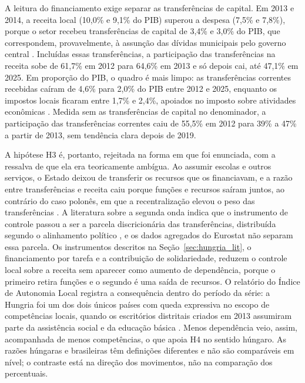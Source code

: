 A leitura do financiamento exige separar as transferências de capital. Em 2013 e 2014, a receita local (10,0\% e 9,1\% do PIB) superou a despesa (7,5\% e 7,8\%), porque o setor recebeu transferências de capital de 3,4\% e 3,0\% do PIB, que correspondem, provavelmente, à assunção das dívidas municipais pelo governo central \citep{Bethlendi2018, Racz202191}. Incluídas essas transferências, a participação das transferências na receita sobe de 61,7\% em 2012 para 64,6\% em 2013 e só depois cai, até 47,1\% em 2025. Em proporção do PIB, o quadro é mais limpo: as transferências correntes recebidas caíram de 4,6\% para 2,0\% do PIB entre 2012 e 2025, enquanto os impostos locais ficaram entre 1,7\% e 2,4\%, apoiados no imposto sobre atividades econômicas \citep{Kecso2020}. Medida sem as transferências de capital no denominador, a participação das transferências correntes caiu de 55,5\% em 2012 para 39\% a 47\% a partir de 2013, sem tendência clara depois de 2019.

A hipótese H3 é, portanto, rejeitada na forma em que foi enunciada, com a ressalva de que ela era teoricamente ambígua. Ao assumir escolas e outros serviços, o Estado deixou de transferir os recursos que os financiavam, e a razão entre transferências e receita caiu porque funções e recursos saíram juntos, ao contrário do caso polonês, em que a recentralização elevou o peso das transferências \citep{Poniatowicz202489}. A literatura sobre a segunda onda indica que o instrumento de controle passou a ser a parcela discricionária das transferências, distribuída segundo o alinhamento político \citep{Vasvari2024467, Vasvari20241371, Kovarek2023}, e os dados agregados do Eurostat não separam essa parcela. Os instrumentos descritos na Seção~\ref{sec:hungria_lit}, o financiamento por tarefa e a contribuição de solidariedade, reduzem o controle local sobre a receita sem aparecer como aumento de dependência, porque o primeiro retira funções e o segundo é uma saída de recursos. O relatório do Índice de Autonomia Local registra a consequência dentro do período da série: a Hungria foi um dos dois únicos países com queda expressiva no escopo de competências locais, quando os escritórios distritais criados em 2013 assumiram parte da assistência social e da educação básica \citep{LAIreport}. Menos dependência veio, assim, acompanhada de menos competências, o que apoia H4 no sentido húngaro. As razões húngaras e brasileiras têm definições diferentes e não são comparáveis em nível; o contraste está na direção dos movimentos, não na comparação dos percentuais.

